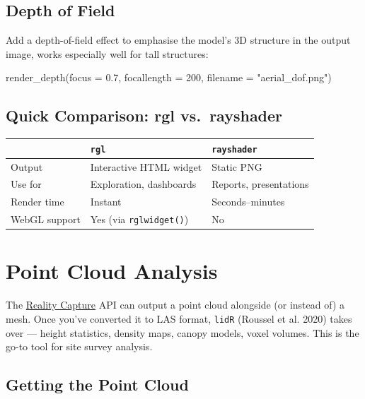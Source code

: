 \documentclass[
  11pt,
  letterpaper,
  DIV=11,
  numbers=noendperiod]{scrreprt}
\newenvironment{Shaded}{\begin{snugshade}}{\end{snugshade}}
\newcommand{\AttributeTok}[1]{\textcolor[rgb]{0.40,0.45,0.13}{#1}}
\newcommand{\DecValTok}[1]{\textcolor[rgb]{0.68,0.00,0.00}{#1}}
\newcommand{\FloatTok}[1]{\textcolor[rgb]{0.68,0.00,0.00}{#1}}
\newcommand{\FunctionTok}[1]{\textcolor[rgb]{0.28,0.35,0.67}{#1}}
\newcommand{\NormalTok}[1]{\textcolor[rgb]{0.00,0.23,0.31}{#1}}
\newcommand{\StringTok}[1]{\textcolor[rgb]{0.13,0.47,0.30}{#1}}
\begin{document}
\section{Depth of Field}\label{depth-of-field}

Add a depth-of-field effect to emphasise the model's 3D structure in the
output image, works especially well for tall structures:

\begin{Shaded}
\begin{Highlighting}[]
\FunctionTok{render\_depth}\NormalTok{(}\AttributeTok{focus       =} \FloatTok{0.7}\NormalTok{,}
             \AttributeTok{focallength =} \DecValTok{200}\NormalTok{,}
             \AttributeTok{filename    =} \StringTok{"aerial\_dof.png"}\NormalTok{)}
\end{Highlighting}
\end{Shaded}

\section{Quick Comparison: rgl
vs.~rayshader}\label{quick-comparison-rgl-vs.-rayshader}

\begin{longtable}[]{@{}lll@{}}
\toprule\noalign{}
& \texttt{rgl} & \texttt{rayshader} \\
\midrule\noalign{}
\endhead
\bottomrule\noalign{}
\endlastfoot
Output & Interactive HTML widget & Static PNG \\
Use for & Exploration, dashboards & Reports, presentations \\
Render time & Instant & Seconds--minutes \\
WebGL support & Yes (via \texttt{rglwidget()}) & No \\
\end{longtable}

\chapter{Point Cloud Analysis}\label{point-cloud-analysis}

The \hyperref[reality-capture]{Reality Capture} API can output a point
cloud alongside (or instead of) a mesh. Once you've converted it to LAS
format, \texttt{lidR} (Roussel et al. 2020) takes over --- height
statistics, density maps, canopy models, voxel volumes. This is the
go-to tool for site survey analysis.

\section{Getting the Point Cloud}\label{getting-the-point-cloud}
\end{document}
